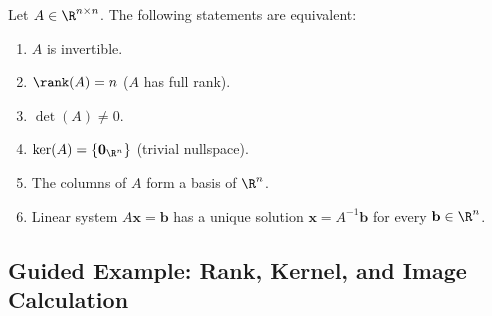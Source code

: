 \begin{theorem}
Let $A \in \R^{n \times n}$. The following statements are equivalent:
\mbox{}\par\nopagebreak
\begin{enumerate}
    \item $A$ is invertible.
    \item $\rank(A) = n$ ($A$ has full rank).
    \item $\det(A) \neq 0$.
    \item $\ker(A) = \{ \mathbf{0}_{\R^n} \}$ (trivial nullspace).
    \item The columns of $A$ form a basis of $\R^n$.
    \item Linear system $A\mathbf{x} = \mathbf{b}$ has a unique solution $\mathbf{x} = A^{-1}\mathbf{b}$ for every $\mathbf{b} \in \R^n$.
\end{enumerate}
\end{theorem}

\subsection{Guided Example: Rank, Kernel, and Image Calculation}

